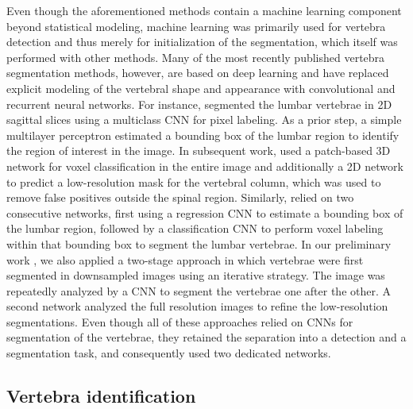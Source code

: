 \documentclass[authoryear,5p,final,times]{elsarticle}
\begin{document}
    Even though the aforementioned methods contain a machine learning component beyond statistical modeling, machine learning was primarily used for vertebra detection and thus merely for initialization of the segmentation, which itself was performed with other methods. Many of the most recently published vertebra segmentation methods, however, are based on deep learning and have replaced explicit modeling of the vertebral shape and appearance with convolutional and recurrent neural networks. For instance, \citet{Sekuboyina2017} segmented the lumbar vertebrae in 2D sagittal slices using a multiclass CNN for pixel labeling. As a prior step, a simple multilayer perceptron estimated a bounding box of the lumbar region to identify the region of interest in the image. In subsequent work, \citet{Sekuboyina2018} used a patch-based 3D network for voxel classification in the entire image and additionally a 2D network to predict a low-resolution mask for the vertebral column, which was used to remove false positives outside the spinal region. Similarly, \citet{Janssens2018} relied on two consecutive networks, first using a regression CNN to estimate a bounding box of the lumbar region, followed by a classification CNN to perform voxel labeling within that bounding box to segment the lumbar vertebrae. In our preliminary work \citep{Lessmann2018b}, we also applied a two-stage approach in which vertebrae were first segmented in downsampled images using an iterative strategy. The image was repeatedly analyzed by a CNN to segment the vertebrae one after the other. A second network analyzed the full resolution images to refine the low-resolution segmentations. Even though all of these approaches relied on CNNs for segmentation of the vertebrae, they retained the separation into a detection and a segmentation task, and consequently used two dedicated networks.
        
    \subsection{Vertebra identification}
    
\end{document}
